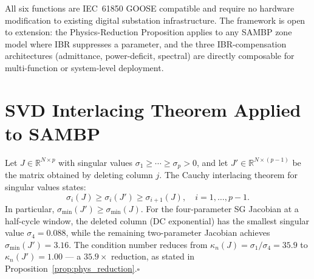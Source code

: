 \documentclass[journal,twoside]{IEEEtran}
\begin{document}
All six functions are IEC~61850 GOOSE compatible and require no hardware
modification to existing digital substation infrastructure.
The framework is open to extension: the Physics-Reduction Proposition applies
to any SAMBP zone model where IBR suppresses a parameter, and the three
IBR-compensation architectures (admittance, power-deficit, spectral) are
directly composable for multi-function or system-level deployment.

\appendix
\section{SVD Interlacing Theorem Applied to SAMBP}
\label{app:svd}

Let $J \in \mathbb{R}^{N \times p}$ with singular values
$\sigma_1 \geq \cdots \geq \sigma_p > 0$, and let
$J' \in \mathbb{R}^{N \times (p-1)}$ be the matrix obtained by deleting column
$j$.
The Cauchy interlacing theorem for singular values states:
\begin{equation}
  \sigma_i(J) \geq \sigma_i(J') \geq \sigma_{i+1}(J),
  \quad i = 1, \ldots, p-1.
  \label{eq:interlacing}
\end{equation}
In particular, $\sigma_{\min}(J') \geq \sigma_{\min}(J)$.
For the four-parameter SG Jacobian at a half-cycle window, the deleted column
(DC exponential) has the smallest singular value $\sigma_4 = 0.088$, while the
remaining two-parameter Jacobian achieves $\sigma_{\min}(J') = 3.16$.
The condition number reduces from
$\kappa_n(J) = \sigma_1/\sigma_4 = 35.9$ to $\kappa_n(J') = 1.00$ --- a
$35.9\times$ reduction, as stated in
Proposition~\ref{prop:phys_reduction}.\hfill$\square$



\end{document}
